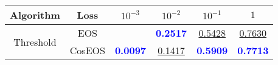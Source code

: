 \begin{table}[t]
\centering
\begin{tabularx}{.7\textwidth}{c|c|cccc}
\bf Algorithm & \bf Loss & $10^{-3}$ & $10^{-2}$ & $10^{-1}$ & $1$\\\hline\hline
\multirow{2}{*}{Threshold} & EOS & & \textcolor{blue}{\bf 0.2517} & \underline{0.5428} & \underline{0.7630}\\
 & CosEOS & \textcolor{blue}{\bf 0.0097} & \underline{0.1417} & \textcolor{blue}{\bf 0.5909} & \textcolor{blue}{\bf 0.7713}\\
\hline
\end{tabularx}
\end{table}